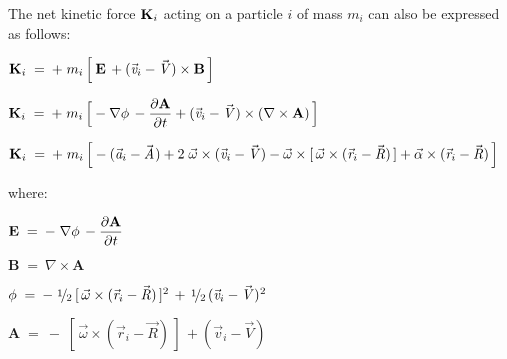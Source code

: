\documentclass[10pt]{article}
\newcommand{\med}{\raise.5ex\hbox{$\scriptstyle 1$}\kern-.15em/\kern-.09em\lower.25ex\hbox{$\scriptstyle 2$}}
\begin{document}
\par \bigskip \noindent The net kinetic force ${\mathbf{K}}_{\hspace{+0.009em}i}$ acting on a particle $i$ of mass $m_i$ can also be expressed as follows:

\par \bigskip ${\mathbf{K}}_{\hspace{+0.009em}i} \;=\: + \; m_i \, \Big[ \: {\mathbf{E}} \, + ({\vec{\mathit{v}}}_{i} - {\vec{\mathit{V}}}) \times {\mathbf{B}} \, \Big]$

\par \bigskip ${\mathbf{K}}_{\hspace{+0.009em}i} \;=\: + \; m_i \, \Big[ - \nabla \phi \, - \dfrac{\partial{\mathbf{A}}}{\partial{\hspace{+0.03em}t}} + ({\vec{\mathit{v}}}_{i} - {\vec{\mathit{V}}}) \times (\nabla \times {\mathbf{A}}) \, \Big]$

\par \bigskip ${\mathbf{K}}_{\hspace{+0.009em}i} \;=\: + \; m_i \, \Big[ - ({\vec{\mathit{a}}}_{i} - {\vec{\mathit{A}}}\hspace{+0.06em}) + 2 \; {\vec{\omega}} \times ({\vec{\mathit{v}}}_{i} - {\vec{\mathit{V}}}) - {\vec{\omega}} \times [ \, {\vec{\omega}} \times ({\vec{\mathit{r}}}_{i} - {\vec{\mathit{R}}}) \, ] + {\vec{\alpha}} \times ({\vec{\mathit{r}}}_{i} - {\vec{\mathit{R}}}) \, \Big]$

\par \bigskip \noindent where:

\par \bigskip ${\mathbf{E}} \;=\: - \; \nabla \phi \, - \dfrac{\partial{\mathbf{A}}}{\partial{\hspace{+0.03em}t}}$

\par \bigskip ${\mathbf{B}} \;=\: \nabla \times {\mathbf{A}}$

\par \bigskip $\phi \;=\: - \; \med \: [ \, {\vec{\omega}} \times ({\vec{\mathit{r}}}_{i} - {\vec{\mathit{R}}}) \, ]^{\hspace{+0.006em}2} \, + \, \med \, ( {\vec{\mathit{v}}}_{i} - {\vec{\mathit{V}}})^{\hspace{+0.03em}2}$

\par \bigskip ${\mathbf{A}} \;=\: - \; [ \, {\vec{\omega}} \times ({\vec{\mathit{r}}}_{i} - {\vec{\mathit{R}}}) \, ] \, + ( {\vec{\mathit{v}}}_{i} - {\vec{\mathit{V}}})$
\end{document}
